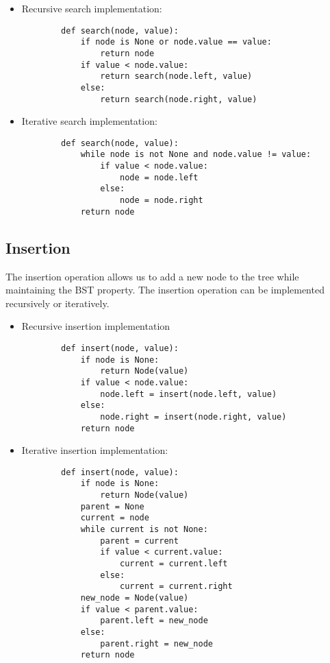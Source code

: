 \documentclass[a4paper, 11pt, oneside]{book} %
\begin{document}
\begin{itemize}
    \item Recursive search implementation:
        \begin{lstlisting}
        def search(node, value):
            if node is None or node.value == value:
                return node
            if value < node.value:
                return search(node.left, value)
            else:
                return search(node.right, value)
        \end{lstlisting}
    \item Iterative search implementation:
        \begin{lstlisting}
        def search(node, value):
            while node is not None and node.value != value:
                if value < node.value:
                    node = node.left
                else:
                    node = node.right
            return node
        \end{lstlisting}
\end{itemize}

\subsection{Insertion}
The insertion operation allows us to add a new node to the tree while maintaining the BST property. The insertion operation can be implemented recursively or iteratively.

\begin{itemize}
    \item Recursive insertion implementation
        \begin{lstlisting}
        def insert(node, value):
            if node is None:
                return Node(value)
            if value < node.value:
                node.left = insert(node.left, value)
            else:
                node.right = insert(node.right, value)
            return node
        \end{lstlisting}
    \item Iterative insertion implementation:
        \begin{lstlisting}
        def insert(node, value):
            if node is None:
                return Node(value)
            parent = None
            current = node
            while current is not None:
                parent = current
                if value < current.value:
                    current = current.left
                else:
                    current = current.right
            new_node = Node(value)
            if value < parent.value:
                parent.left = new_node
            else:
                parent.right = new_node
            return node
        \end{lstlisting}

\end{itemize}
\end{document}
